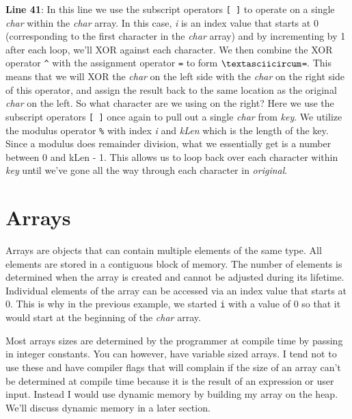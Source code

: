 \documentclass[../main.tex]{subfiles}
\begin{document}
	\textbf{Line 41}:  In this line we use the subscript operators \texttt{[ ]} to operate on a single \textit{char} within the \textit{char} array.  In this case, \textit{i} is an index value that starts at 0 (corresponding to the first character in the \textit{char} array) and by incrementing by 1 after each loop, we'll XOR against each character.  We then combine the XOR operator \texttt{\textasciicircum} with the assignment operator \texttt{=} to form \texttt{$\textasciicircum$=}.  This means that we will XOR the \textit{char} on the left side with the \textit{char} on the right side of this operator, and assign the result back to the same location as the original \textit{char} on the left. So what character are we using on the right?  Here we use the subscript operators \texttt{[ ]} once again to pull out a single \textit{char} from \textit{key}.  We utilize the modulus operator \texttt{\%} with index \textit{i} and \textit{kLen} which is the length of the key.  Since a modulus does remainder division, what we essentially get is a number between 0 and kLen - 1.  This allows us to loop back over each character within \textit{key} until we've gone all the way through each character in \textit{original}.  
	
	
	\section{Arrays}
	
	Arrays are objects that can contain multiple elements of the same type.  All elements are stored in a contiguous block of memory.  The number of elements is determined when the array is created and cannot be adjusted during its lifetime.  Individual elements of the array can be accessed via an index value that starts at 0.  This is why in the previous example, we started \texttt{i} with a value of 0 so that it would start at the beginning of the \textit{char} array.  

	Most arrays sizes are determined by the programmer at compile time by passing in integer constants.  You can however, have variable sized arrays.  I tend not to use these and have compiler flags that will complain if the size of an array can't be determined at compile time because it is the result of an expression or user input.  Instead I would use dynamic memory by building my array on the heap.  We'll discuss dynamic memory in a later section.
	
\end{document}

